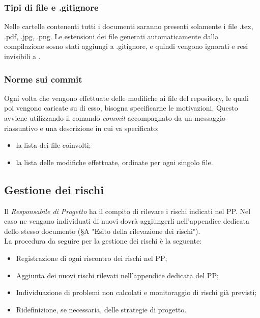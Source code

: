 \documentclass[../NormediProgetto.tex]{subfiles}
\begin{document}
	\subsubsection{Tipi di file e .gitignore}
	
	Nelle cartelle contenenti tutti i documenti saranno presenti solamente i file .tex, .pdf, .jpg, .png. Le estensioni dei file generati automaticamente dalla compilazione sosno stati aggiungi a .gitignore, e quindi vengono ignorati e resi invisibili a .
	
	\subsubsection{Norme sui commit}
	
	Ogni volta che vengono effettuate delle modifiche ai file del repository, le quali poi vengono caricate su di esso, bisogna specificarne le motivazioni. Questo avviene utilizzando il comando \textit{commit} accompagnato da un messaggio riassuntivo e una descrizione in cui va specificato: 
	\begin{itemize}
		\item la lista dei file coinvolti;
		\item la lista delle modifiche effettuate, ordinate per ogni singolo file.
	\end{itemize}

	\subsection{Gestione dei rischi}
	
	Il \textit{Responsabile di Progetto} ha il compito di rilevare i rischi indicati nel PP. Nel caso ne vengano individuati di nuovi dovrà aggiungerli nell'appendice dedicata dello stesso documento (§A "Esito della rilevazione dei rischi"). 
	\\ \noindent La procedura da seguire per la gestione dei rischi è la seguente:
	\begin{itemize}
		\item Registrazione di ogni riscontro dei rischi nel PP;
		\item Aggiunta dei nuovi rischi rilevati nell'appendice dedicata del PP;
		\item Individuazione di problemi non calcolati e monitoraggio di rischi già previsti;
		\item Ridefinizione, se necessaria, delle strategie di progetto.
	\end{itemize}
	
\end{document}
